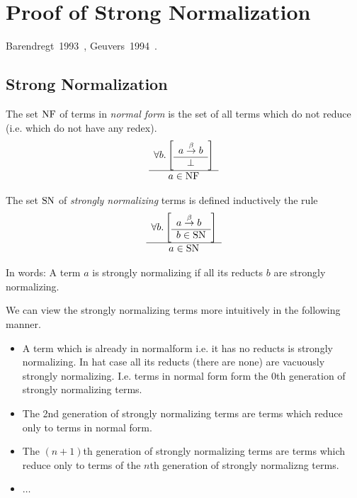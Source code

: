 \section{Proof of Strong Normalization}

Barendregt~1993~\cite{barendregt1993}, Geuvers~1994~\cite{geuvers1994}.





\subsection{Strong Normalization}

\begin{definition}
    The set $\text{NF}$ of terms in \emph{normal form} is the set of all terms which
    do not reduce (i.e. which do not have any redex).
    $$
    \begin{array}{c} 
        \forall b. \left[ \begin{array}{c} a \stackrel{\beta}{\to} b \\ \hline \perp\end{array} \right]
     \\ \hline 
        a \in \text{NF}
    \end{array}
    $$
\end{definition}




\begin{definition}
    The set $\text{SN}$ of \emph{strongly normalizing} terms is defined inductively
    the rule
    $$
        \begin{array}{c} 
            \forall b. \left[ \begin{array}{l} a \stackrel{\beta}{\to} b \\ \hline b \in \text{SN}\end{array} \right]
         \\ \hline 
            a \in \text{SN}
        \end{array}
    $$
\end{definition}

In words: A term $a$ is strongly normalizing if all its reducts $b$ are strongly
normalizing.

We can view the strongly normalizing terms more intuitively in the following
manner.

\begin{itemize}

    \item A term which is already in normalform i.e. it has no reducts is
        strongly normalizing. In hat case all its reducts (there are none) are
        vacuously strongly normalizing. I.e. terms in normal form form the
        $0$th generation of strongly normalizing terms.

    \item The 2nd generation of strongly normalizing terms are terms which
        reduce only to terms in normal form.

    \item The $(n+1)$th generation of strongly normalizing terms are terms which
        reduce only to terms of the $n$th generation of strongly normalizng
        terms.

    \item $\ldots$

\end{itemize}


